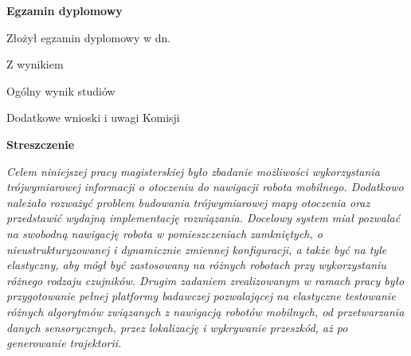 \begin{titlepage}
    \begin{center}
 	{\large\bfseries Egzamin dyplomowy} \par\bigskip\bigskip
    \end{center}
    \par\noindent\vspace{1.5\baselineskip}
    Złożył egzamin dyplomowy w dn. \dotfill
    \par\noindent\vspace{1.5\baselineskip}
    Z wynikiem \dotfill
    \par\noindent\vspace{1.5\baselineskip}
    Ogólny wynik studiów \dotfill
    \par\noindent\vspace{1.5\baselineskip}
    Dodatkowe wnioski i uwagi Komisji \dotfill
    \par\noindent\vspace{1.5\baselineskip}
    \dotfill


	    \cleardoublepage
    \newpage\thispagestyle{empty}
    \begin{center}
	{\large\bfseries Streszczenie}\par\bigskip
    \end{center}

    {\itshape
    Celem niniejszej pracy magisterskiej było zbadanie możliwości wykorzystania
    trójwymiarowej informacji o otoczeniu do nawigacji robota mobilnego. Dodatkowo
    należało rozważyć problem budowania trójwymiarowej mapy otoczenia oraz przedstawić
    wydajną implementację rozwiązania. Docelowy system miał pozwalać na swobodną
    nawigację robota w pomieszczeniach zamkniętych, o nieustrukturyzowanej i
    dynamicznie zmiennej konfiguracji, a także być na tyle elastyczny, aby mógł być
    zastosowany na różnych robotach przy wykorzystaniu różnego rodzaju czujników.
    Drugim zadaniem zrealizowanym w ramach pracy było przygotowanie pełnej platformy
    badawczej pozwalającej na elastyczne testowanie różnych algorytmów związanych
    z nawigacją robotów mobilnych, od przetwarzania danych sensorycznych, przez
    lokalizację i wykrywanie przeszkód, aż po generowanie trajektorii.

}
\end{titlepage}
